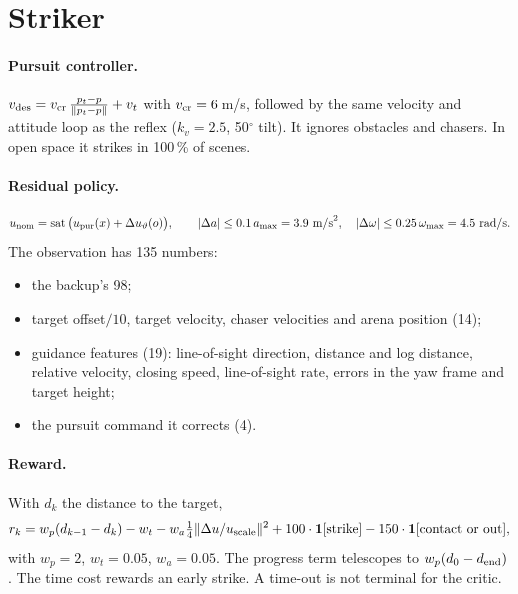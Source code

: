 \documentclass[11pt]{article}
\newcommand{\sat}{\operatorname{sat}}
\begin{document}
\section{Striker}\label{sec:striker}

\paragraph{Pursuit controller.} $v_{\rm des}=v_{\rm cr}\,\frac{p_t-p}{\|p_t-p\|}+v_t$ with $v_{\rm cr}=6$\,m/s, followed by the same velocity and attitude loop as the reflex ($k_v=2.5$, 50$^\circ$ tilt).
It ignores obstacles and chasers. In open space it strikes in 100\,\% of scenes.

\paragraph{Residual policy.}
\begin{equation}
u_{\rm nom}=\sat\big(u_{\rm pur}(x)+\Delta u_\vartheta(o)\big),\qquad |\Delta a|\le0.1\,a_{\max}=3.9\ \text{m/s}^2,\quad |\Delta\omega|\le0.25\,\omega_{\max}=4.5\ \text{rad/s}.
\end{equation}
The observation has 135 numbers:
\begin{itemize}
\item the backup's 98;
\item target offset$/10$, target velocity, chaser velocities and arena position (14);
\item guidance features (19): line-of-sight direction, distance and log distance, relative velocity, closing speed, line-of-sight rate, errors in the yaw frame and target height;
\item the pursuit command it corrects (4).
\end{itemize}

\paragraph{Reward.} With $d_k$ the distance to the target,
\begin{equation}
r_k=w_p(d_{k-1}-d_k)-w_t-w_a\tfrac14\|\Delta u/u_{\rm scale}\|^2+100\cdot\mathbf 1[\text{strike}]-150\cdot\mathbf 1[\text{contact or out}],
\end{equation}
with $w_p=2$, $w_t=0.05$, $w_a=0.05$.
The progress term telescopes to $w_p(d_0-d_{\rm end})$. The time cost rewards an early strike. A time-out is not terminal for the critic.
\end{document}
